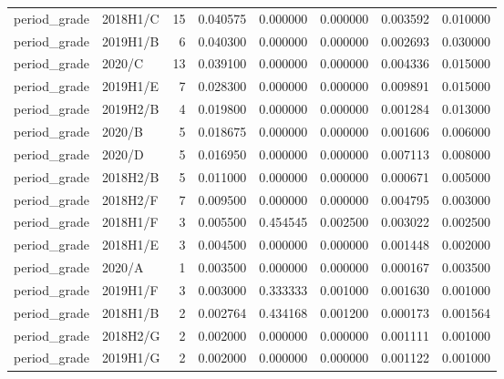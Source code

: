 \begin{tabular}{llrrrrrr}
period\_grade & 2018H1/C & 15 & 0.040575 & 0.000000 & 0.000000 & 0.003592 & 0.010000 \\
period\_grade & 2019H1/B & 6 & 0.040300 & 0.000000 & 0.000000 & 0.002693 & 0.030000 \\
period\_grade & 2020/C & 13 & 0.039100 & 0.000000 & 0.000000 & 0.004336 & 0.015000 \\
period\_grade & 2019H1/E & 7 & 0.028300 & 0.000000 & 0.000000 & 0.009891 & 0.015000 \\
period\_grade & 2019H2/B & 4 & 0.019800 & 0.000000 & 0.000000 & 0.001284 & 0.013000 \\
period\_grade & 2020/B & 5 & 0.018675 & 0.000000 & 0.000000 & 0.001606 & 0.006000 \\
period\_grade & 2020/D & 5 & 0.016950 & 0.000000 & 0.000000 & 0.007113 & 0.008000 \\
period\_grade & 2018H2/B & 5 & 0.011000 & 0.000000 & 0.000000 & 0.000671 & 0.005000 \\
period\_grade & 2018H2/F & 7 & 0.009500 & 0.000000 & 0.000000 & 0.004795 & 0.003000 \\
period\_grade & 2018H1/F & 3 & 0.005500 & 0.454545 & 0.002500 & 0.003022 & 0.002500 \\
period\_grade & 2018H1/E & 3 & 0.004500 & 0.000000 & 0.000000 & 0.001448 & 0.002000 \\
period\_grade & 2020/A & 1 & 0.003500 & 0.000000 & 0.000000 & 0.000167 & 0.003500 \\
period\_grade & 2019H1/F & 3 & 0.003000 & 0.333333 & 0.001000 & 0.001630 & 0.001000 \\
period\_grade & 2018H1/B & 2 & 0.002764 & 0.434168 & 0.001200 & 0.000173 & 0.001564 \\
period\_grade & 2018H2/G & 2 & 0.002000 & 0.000000 & 0.000000 & 0.001111 & 0.001000 \\
period\_grade & 2019H1/G & 2 & 0.002000 & 0.000000 & 0.000000 & 0.001122 & 0.001000 \\
\bottomrule
\end{tabular}
